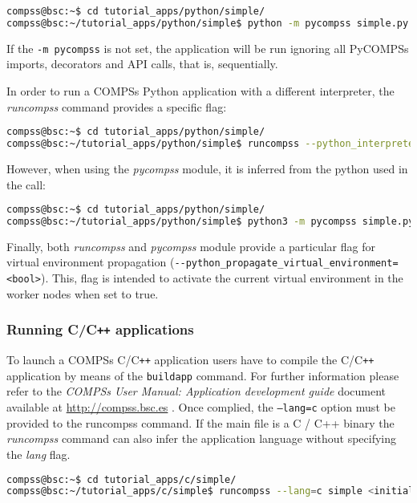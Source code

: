 \begin{lstlisting}[language=bash]
compss@bsc:~$ cd tutorial_apps/python/simple/
compss@bsc:~/tutorial_apps/python/simple$ python -m pycompss simple.py <initial_number>
\end{lstlisting}

If the \verb|-m pycompss| is not set, the application will be run ignoring all PyCOMPSs imports, decorators and API calls, that is, sequentially.

In order to run a COMPSs Python application with a different interpreter, the \textit{runcompss} command provides a specific flag:

\begin{lstlisting}[language=bash]
compss@bsc:~$ cd tutorial_apps/python/simple/
compss@bsc:~/tutorial_apps/python/simple$ runcompss --python_interpreter=python3 ./simple.py <initial_number>
\end{lstlisting}

However, when using the \textit{pycompss} module, it is inferred from the python used in the call:

\begin{lstlisting}[language=bash]
compss@bsc:~$ cd tutorial_apps/python/simple/
compss@bsc:~/tutorial_apps/python/simple$ python3 -m pycompss simple.py <initial_number>
\end{lstlisting}

Finally, both \textit{runcompss} and \textit{pycompss} module provide a particular flag for virtual environment propagation (\verb|--python_propagate_virtual_environment=<bool>|).
This, flag is intended to activate the current virtual environment in the worker nodes when set to true.


\subsubsection{Running C/C\texttt{++} applications}
To launch a COMPSs C/C\texttt{++} application users have to compile the C/C\texttt{++} application by means of the \texttt{buildapp} command.
For further information please refer to the \textit{COMPSs User Manual: Application development guide} document available at
\url{http://compss.bsc.es} . Once complied, the \texttt{--lang=c} option must be provided to the runcompss command. If the main file is 
a C / C++ binary the \textit{runcompss} command can also infer the application language without specifying the \textit{lang} flag. 

\begin{lstlisting}[language=bash]
compss@bsc:~$ cd tutorial_apps/c/simple/
compss@bsc:~/tutorial_apps/c/simple$ runcompss --lang=c simple <initial_number>
\end{lstlisting}

